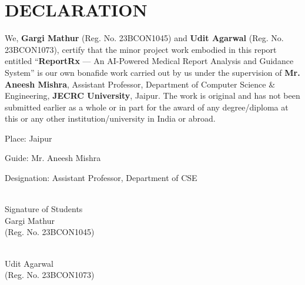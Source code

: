 \documentclass[12pt,a4paper]{report}
\newcommand{\firstorderfont}{\fontsize{16pt}{19.2pt}\selectfont\bfseries}
\begin{document}
\setcounter{page}{1}
\thispagestyle{plain}

\chapter*{DECLARATION}

\noindent We, \textbf{Gargi Mathur} (Reg. No. 23BCON1045) and \textbf{Udit Agarwal} (Reg. No. 23BCON1073), certify that the minor project work embodied in this report entitled ``\textbf{ReportRx} --- An AI-Powered Medical Report Analysis and Guidance System'' is our own bonafide work carried out by us under the supervision of \textbf{Mr. Aneesh Mishra}, Assistant Professor, Department of Computer Science \& Engineering, \textbf{JECRC University}, Jaipur. The work is original and has not been submitted earlier as a whole or in part for the award of any degree/diploma at this or any other institution/university in India or abroad.

\vspace{1.5cm}
\noindent Place: Jaipur

\vspace{2cm}
\noindent {\firstorderfont Counter Signature}

\vspace{1.5cm}
\noindent Guide: Mr. Aneesh Mishra

\noindent Designation: Assistant Professor, Department of CSE

\vspace{1.5cm}
\noindent\begin{minipage}{0.45\textwidth}
    \hrulefill \\
    Signature of Students \\[0.2cm]
    Gargi Mathur \\[0.2cm]
    (Reg. No. 23BCON1045)
\end{minipage}
\hfill
\begin{minipage}{0.45\textwidth}
    \hrulefill \\
    Udit Agarwal \\[0.2cm]
    (Reg. No. 23BCON1073)
\end{minipage}

\clearpage

\setcounter{page}{2}
\thispagestyle{plain}
\end{document}
